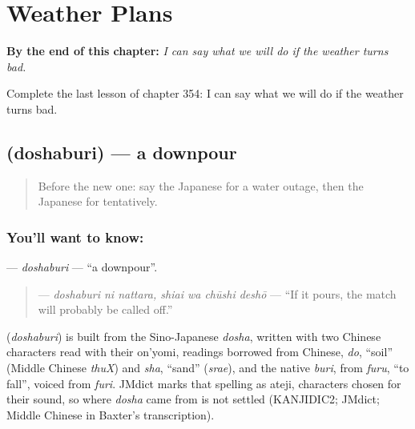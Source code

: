 
\chapter{Weather Plans}
\label{ch:ja-weather-plans}

\begin{chapteropening}
\textbf{By the end of this chapter:} \emph{I can say what we will do if the weather turns bad.}

Complete the last lesson of chapter 354: I can say what we will do if the weather turns bad.
\end{chapteropening}

\section[\texorpdfstring{\ja{どしゃぶり} (doshaburi)}{どしゃぶり (doshaburi)}]{ (doshaburi) — a downpour}

\label{lesson:JA-C354-doshaburi}



\begin{quote}
Before the new one: say the Japanese for a water outage, then the Japanese for tentatively.
\end{quote}

\subsection*{You'll want to know: }
\textbf{} — \emph{doshaburi} — \textquotedblleft{}a downpour\textquotedblright{}.

\begin{quote}
\textbf{  } — \emph{doshaburi ni nattara, shiai wa chūshi deshō} — \textquotedblleft{}If it pours, the match will probably be called off.\textquotedblright{}
\end{quote}

\begin{cousinweb}
\textbf{} (\emph{doshaburi}) is built from the Sino-Japanese \emph{dosha}, written with two Chinese characters read with their on'yomi, readings borrowed from Chinese, \emph{do}, \textquotedblleft{}soil\textquotedblright{} (Middle Chinese \emph{thuX}) and \emph{sha}, \textquotedblleft{}sand\textquotedblright{} (\emph{srae}), and the native \emph{buri}, from \emph{furu}, \textquotedblleft{}to fall\textquotedblright{}, voiced from \emph{furi}. JMdict marks that spelling as ateji, characters chosen for their sound, so where \emph{dosha} came from is not settled (KANJIDIC2; JMdict; Middle Chinese in Baxter's transcription).
\end{cousinweb}

